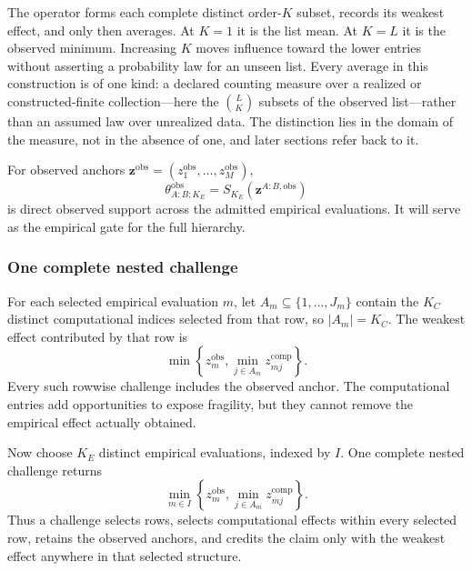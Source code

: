 \documentclass[11pt]{article}
\theoremstyle{remark}
\begin{document}
The operator forms each complete distinct order-$K$ subset, records its weakest
effect, and only then averages. At $K=1$ it is the list mean. At $K=L$ it is
the observed minimum. Increasing $K$ moves influence toward the lower entries
without asserting a probability law for an unseen list. Every average in this
construction is of one kind: a declared counting measure over a realized or
constructed-finite collection---here the $\binom{L}{K}$ subsets of the observed
list---rather than an assumed law over unrealized data. The distinction lies in
the domain of the measure, not in the absence of one, and later sections refer
back to it.

For observed anchors
$\mathbf z^{\mathrm{obs}}=(z_1^{\mathrm{obs}},\ldots,z_M^{\mathrm{obs}})$,
\begin{equation}
\theta^{\mathrm{obs}}_{A:B;K_E}
=
S_{K_E}(\mathbf z^{A:B,\mathrm{obs}})
\label{eq:observed-support}
\end{equation}
is direct observed support across the admitted empirical evaluations.
It will serve as the empirical gate for the full hierarchy.

\subsubsection{One complete nested challenge}

For each selected empirical evaluation $m$, let
$A_m\subseteq\{1,\ldots,J_m\}$ contain the $K_C$ distinct computational
indices selected from that row, so $|A_m|=K_C$. The weakest effect contributed
by that row is
\[
\min\left\{
z_m^{\mathrm{obs}},
\min_{j\in A_m}z_{mj}^{\mathrm{comp}}
\right\}.
\]
Every such rowwise challenge includes the observed anchor. The computational
entries add opportunities to expose fragility, but they cannot remove the
empirical effect actually obtained.

Now choose $K_E$ distinct empirical evaluations, indexed by $I$. One complete
nested challenge returns
\[
\min_{m\in I}
\left\{
z_m^{\mathrm{obs}},
\min_{j\in A_m}z_{mj}^{\mathrm{comp}}
\right\}.
\]
Thus a challenge selects rows, selects computational effects within every
selected row, retains the observed anchors, and credits the claim only with the
weakest effect anywhere in that selected structure.
\end{document}
